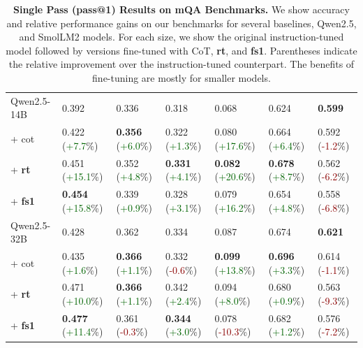 \documentclass[11pt]{article}
\newcommand{\dataset}{\textbf{fs1}}
\begin{document}
\begin{table}[t]
\begin{tabular}{lllllll}
\midrule
Qwen2.5-14B & 0.392 & 0.336 & 0.318 & 0.068 & 0.624 & \textbf{0.599} \\
\hspace{1em} + {cot} & 0.422 (\textcolor{darkgreen}{+7.7}\%) & \textbf{0.356} (\textcolor{darkgreen}{+6.0}\%) & 0.322 (\textcolor{darkgreen}{+1.3}\%) & 0.080 (\textcolor{darkgreen}{+17.6}\%) & 0.664 (\textcolor{darkgreen}{+6.4}\%) & 0.592 (\textcolor{darkred}{-1.2}\%) \\
\hspace{1em} + {\textbf{rt}} & 0.451 (\textcolor{darkgreen}{+15.1}\%) & 0.352 (\textcolor{darkgreen}{+4.8}\%) & \textbf{0.331} (\textcolor{darkgreen}{+4.1}\%) & \textbf{0.082} (\textcolor{darkgreen}{+20.6}\%) & \textbf{0.678} (\textcolor{darkgreen}{+8.7}\%) & 0.562 (\textcolor{darkred}{-6.2}\%) \\
\hspace{1em} + {\textbf{fs1}} & \textbf{0.454} (\textcolor{darkgreen}{+15.8}\%) & 0.339 (\textcolor{darkgreen}{+0.9}\%) & 0.328 (\textcolor{darkgreen}{+3.1}\%) & 0.079 (\textcolor{darkgreen}{+16.2}\%) & 0.654 (\textcolor{darkgreen}{+4.8}\%) & 0.558 (\textcolor{darkred}{-6.8}\%) \\
\midrule
Qwen2.5-32B & 0.428 & 0.362 & 0.334 & 0.087 & 0.674 & \textbf{0.621} \\
\hspace{1em} + {cot} & 0.435 (\textcolor{darkgreen}{+1.6}\%) & \textbf{0.366} (\textcolor{darkgreen}{+1.1}\%) & 0.332 (\textcolor{darkred}{-0.6}\%) & \textbf{0.099} (\textcolor{darkgreen}{+13.8}\%) & \textbf{0.696} (\textcolor{darkgreen}{+3.3}\%) & 0.614 (\textcolor{darkred}{-1.1}\%) \\
\hspace{1em} + {\textbf{rt}} & 0.471 (\textcolor{darkgreen}{+10.0}\%) & \textbf{0.366} (\textcolor{darkgreen}{+1.1}\%) & 0.342 (\textcolor{darkgreen}{+2.4}\%) & 0.094 (\textcolor{darkgreen}{+8.0}\%) & 0.680 (\textcolor{darkgreen}{+0.9}\%) & 0.563 (\textcolor{darkred}{-9.3}\%) \\
\hspace{1em} + {\textbf{fs1}} & \textbf{0.477} (\textcolor{darkgreen}{+11.4}\%) & 0.361 (\textcolor{darkred}{-0.3}\%) & \textbf{0.344} (\textcolor{darkgreen}{+3.0}\%) & 0.078 (\textcolor{darkred}{-10.3}\%) & 0.682 (\textcolor{darkgreen}{+1.2}\%) & 0.576 (\textcolor{darkred}{-7.2}\%) \\
\bottomrule
\end{tabular}
\caption{\textbf{Single Pass (pass@1) Results on mQA Benchmarks.} We show accuracy and relative performance gains on our benchmarks for several baselines, Qwen2.5, and SmolLM2 models. For each size, we show the original instruction-tuned model followed by versions fine-tuned with CoT, \textbf{rt}, and \dataset{}. Parentheses indicate the relative improvement over the instruction-tuned counterpart. The benefits of fine-tuning are mostly for smaller models.}
\label{tab:passatone}
\end{table}
\end{document}

